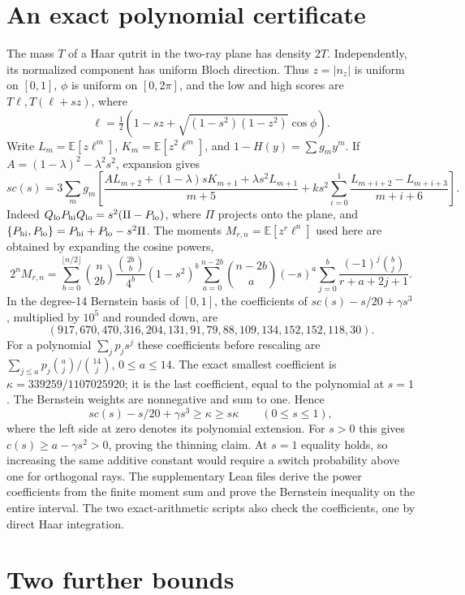 \documentclass[10pt,a4paper]{article}
\newcommand{\E}{\mathbb E}
\begin{document}
\section{An exact polynomial certificate}
The mass \(T\) of a Haar qutrit in the two-ray plane has density \(2T\).
Independently, its normalized component has uniform Bloch direction. Thus
\(z=|n_z|\) is uniform on \([0,1]\), \(\phi\) is uniform on \([0,2\pi]\),
and the low and high scores are \(T\ell,T(\ell+sz)\), where
\[
 \ell=\tfrac12(1-sz+\sqrt{(1-s^2)(1-z^2)}\cos\phi).
\]
Write \(L_m=\E[z\ell^m]\), \(K_m=\E[z^2\ell^m]\), and \(1-H(y)=\sum g_m y^m\).
If \(A=(1-\lambda)^2-\lambda^2s^2\), expansion gives
\[
 s c(s)=3\sum_m g_m\!\left[
 \frac{A L_{m+2}+(1-\lambda)s K_{m+1}+\lambda s^2L_{m+1}}{m+5}
 + k s^2\sum_{i=0}^{1}\frac{L_{m+i+2}-L_{m+i+3}}{m+i+6}\right].
\]
Indeed \(Q_{\rm lo}P_{\rm hi}Q_{\rm lo}=s^2(\Pi-P_{\rm lo})\), where
\(\Pi\) projects onto the plane, and
\(\{P_{\rm hi},P_{\rm lo}\}=P_{\rm hi}+P_{\rm lo}-s^2\Pi\).
The moments \(M_{r,n}=\E[z^r\ell^n]\) used here are obtained by expanding the cosine powers,
\[
 2^nM_{r,n}=\sum_{b=0}^{\lfloor n/2\rfloor}\binom n{2b}
 \frac{\binom{2b}b}{4^b}(1-s^2)^b
 \sum_{a=0}^{n-2b}\binom{n-2b}{a}(-s)^a
 \sum_{j=0}^{b}\frac{(-1)^j\binom bj}{r+a+2j+1}.
\]
In the degree-14 Bernstein basis of \([0,1]\), the coefficients of
\(s c(s)-s/20+\gamma s^3\), multiplied by \(10^5\) and rounded down, are
\[
 (917,670,470,316,204,131,91,79,88,109,134,152,152,118,30).
\]
For a polynomial \(\sum_j p_j s^j\) these coefficients before rescaling
are \(\sum_{j\le a}p_j\binom aj/\binom{14}j\), \(0\le a\le14\).
The exact smallest coefficient is \(\kappa=339259/1107025920\); it is the last coefficient, equal to the polynomial at \(s=1\). The Bernstein weights are nonnegative and sum to one. Hence
\[
 s c(s)-s/20+\gamma s^3\ge\kappa\ge s\kappa \qquad(0\le s\le1),
\]
where the left side at zero denotes its polynomial extension. For \(s>0\) this gives \(c(s)\ge a-\gamma s^2>0\), proving the thinning claim. At \(s=1\) equality holds, so increasing the same additive constant would require a switch probability above one for orthogonal rays. The supplementary Lean files derive the power coefficients from the finite moment sum and prove the Bernstein inequality on the entire interval. The two exact-arithmetic scripts also check the coefficients, one by direct Haar integration.

\section{Two further bounds}
\end{document}
